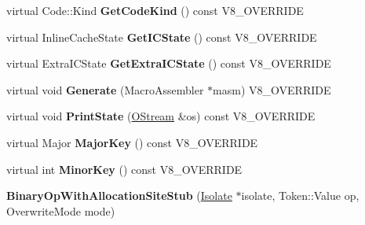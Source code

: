 \begin{DoxyCompactItemize}
\item 
\hypertarget{classv8_1_1internal_1_1_v8___f_i_n_a_l_ae395d8f8650a2482aa083c498e8857a7}{}virtual Code\+::\+Kind {\bfseries Get\+Code\+Kind} () const V8\+\_\+\+O\+V\+E\+R\+R\+I\+D\+E\label{classv8_1_1internal_1_1_v8___f_i_n_a_l_ae395d8f8650a2482aa083c498e8857a7}

\item 
\hypertarget{classv8_1_1internal_1_1_v8___f_i_n_a_l_a395cff2ecda01e817e3b9cc1fcf3b6b9}{}virtual Inline\+Cache\+State {\bfseries Get\+I\+C\+State} () const V8\+\_\+\+O\+V\+E\+R\+R\+I\+D\+E\label{classv8_1_1internal_1_1_v8___f_i_n_a_l_a395cff2ecda01e817e3b9cc1fcf3b6b9}

\item 
\hypertarget{classv8_1_1internal_1_1_v8___f_i_n_a_l_a63f1e4b20170a2eb9b191e6b716725d3}{}virtual Extra\+I\+C\+State {\bfseries Get\+Extra\+I\+C\+State} () const V8\+\_\+\+O\+V\+E\+R\+R\+I\+D\+E\label{classv8_1_1internal_1_1_v8___f_i_n_a_l_a63f1e4b20170a2eb9b191e6b716725d3}

\item 
\hypertarget{classv8_1_1internal_1_1_v8___f_i_n_a_l_ab220aa2cee454b75c7ec2acd2dc06989}{}virtual void {\bfseries Generate} (Macro\+Assembler $\ast$masm) V8\+\_\+\+O\+V\+E\+R\+R\+I\+D\+E\label{classv8_1_1internal_1_1_v8___f_i_n_a_l_ab220aa2cee454b75c7ec2acd2dc06989}

\item 
\hypertarget{classv8_1_1internal_1_1_v8___f_i_n_a_l_a41de7f9729db855f4541618e10ecd455}{}virtual void {\bfseries Print\+State} (\hyperlink{classv8_1_1internal_1_1_o_stream}{O\+Stream} \&os) const V8\+\_\+\+O\+V\+E\+R\+R\+I\+D\+E\label{classv8_1_1internal_1_1_v8___f_i_n_a_l_a41de7f9729db855f4541618e10ecd455}

\item 
\hypertarget{classv8_1_1internal_1_1_v8___f_i_n_a_l_ae50db15936b838b4fcfbc1995bf37ad5}{}virtual Major {\bfseries Major\+Key} () const V8\+\_\+\+O\+V\+E\+R\+R\+I\+D\+E\label{classv8_1_1internal_1_1_v8___f_i_n_a_l_ae50db15936b838b4fcfbc1995bf37ad5}

\item 
\hypertarget{classv8_1_1internal_1_1_v8___f_i_n_a_l_a3eda497cfb51b7985b8065a4e7e6ee02}{}virtual int {\bfseries Minor\+Key} () const V8\+\_\+\+O\+V\+E\+R\+R\+I\+D\+E\label{classv8_1_1internal_1_1_v8___f_i_n_a_l_a3eda497cfb51b7985b8065a4e7e6ee02}

\item 
\hypertarget{classv8_1_1internal_1_1_v8___f_i_n_a_l_aee65f2ef9943d0b01d860eafcf60aeef}{}{\bfseries Binary\+Op\+With\+Allocation\+Site\+Stub} (\hyperlink{classv8_1_1internal_1_1_isolate}{Isolate} $\ast$isolate, Token\+::\+Value op, Overwrite\+Mode mode)\label{classv8_1_1internal_1_1_v8___f_i_n_a_l_aee65f2ef9943d0b01d860eafcf60aeef}


\end{DoxyCompactItemize}
